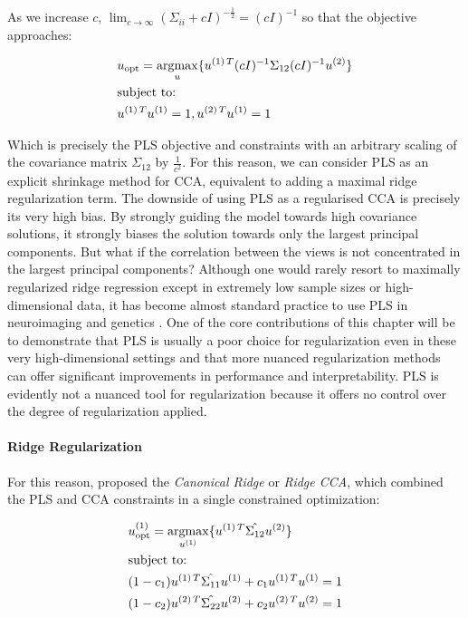 As we increase $c$, $\lim_{c \to \infty} (\Sigma_{ii}+ c I)^{-\frac{1}{2}}= (c I)^{-1}$ so that the objective approaches:

\begin{align}
    & u_{\text{opt}}=\underset{u}{\mathrm{argmax}}\{ u^{(1)\,T}(c I)^{-1}\Sigma_{12}(c I)^{-1}u^{(2)} \} \\
    & \text{subject to:} \notag \\
    & u^{(1)\,T}u^{(1)}=1, u^{(2)\,T}u^{(1)}=1 \notag
\end{align}

Which is precisely the PLS objective and constraints with an arbitrary scaling of the covariance matrix $\Sigma_{12}$ by $\frac{1}{c^2}$.
For this reason, we can consider PLS as an explicit shrinkage method for CCA, equivalent to adding a maximal ridge regularization term.
The downside of using PLS as a regularised CCA is precisely its very high bias.
By strongly guiding the model towards high covariance solutions, it strongly biases the solution towards only the largest principal components.
But what if the correlation between the views is not concentrated in the largest principal components?
Although one would rarely resort to maximally regularized ridge regression except in extremely low sample sizes or high-dimensional data, it has become almost standard practice to use PLS in neuroimaging and genetics \citep{cruciani2022pls, krishnan2011partial}.
One of the core contributions of this chapter will be to demonstrate that PLS is usually a poor choice for regularization even in these very high-dimensional settings and that more nuanced regularization methods can offer significant improvements in performance and interpretability.
PLS is evidently not a nuanced tool for regularization because it offers no control over the degree of regularization applied.

\paragraph{Ridge Regularization} For this reason, \citet{vinod1976canonical} proposed the \textit{Canonical Ridge} or \textit{Ridge CCA}, which combined the PLS and CCA constraints in a single constrained optimization:

\begin{align}
    & u^{(1)}_{\text{opt}} = \underset{u^{(1)}}{\mathrm{argmax}} \{ u^{(1)\,T} \hat{\Sigma_{12}} u^{(2)} \} \\
    & \text{subject to:} \notag \\
    & (1 - c_1) u^{(1)\,T} \hat{\Sigma_{11}} u^{(1)} + c_1 u^{(1)\,T} u^{(1)} = 1 \notag \\
    & (1 - c_2) u^{(2)\,T} \hat{\Sigma_{22}} u^{(2)} + c_2 u^{(2)\,T} u^{(2)} = 1 \notag
\end{align}

